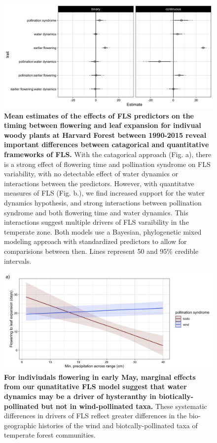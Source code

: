 \documentclass{article}
\begin{document}
 \begin{figure}[h!]
        \centering
          \includegraphics[width=\textwidth]{..//HF.jpeg}
          \caption{\textbf{Mean estimates of the effects of FLS predictors on the timing between flowering and leaf expansion for indivual woody plants at Harvard Forest between 1990-2015 reveal important differences between catagorical and quantitative frameworks of FLS.}  With the catagorical approach (Fig. a), there is a strong effect of flowering time and pollination syndrome on FLS variability, with no detectable effect of water dynamics or interactions between the predictors. However, with quantitatve measures of FLS (Fig. b.), we find increased support for the water dynamics hypothesis, and strong interactions between pollination syndrome and both flowering time and water dynamics. This interactions suggest multiple drivers of FLS varaibility in the temperate zone.  Both models use a Bayesian, phylogenetic mixed modeling approach with standardized predictors to allow for comparisions between then.  Lines represent 50 and 95\% credible intervals.}  
        \label{fig:muplots.HF}
    \end{figure}    

    

 \begin{figure}[h!]
        \centering
          \includegraphics[width=\textwidth]{..//HarvardForest/apcs.jpeg}
           \caption{\textbf{ For indiviudals flowering in early May, marginal effects from our qunatitative FLS model suggest that water dynamics may be a driver of hysteranthy in biotically-pollinated but not in wind-pollinated taxa.}  These systematic differences in drivers of FLS reflect greater differences in the bio-geographic histories of the wind and biotcally-pollinated taxa of temperate forest communities.}
        \label{fig:apcs}
    \end{figure}
 

    
\end{document}

